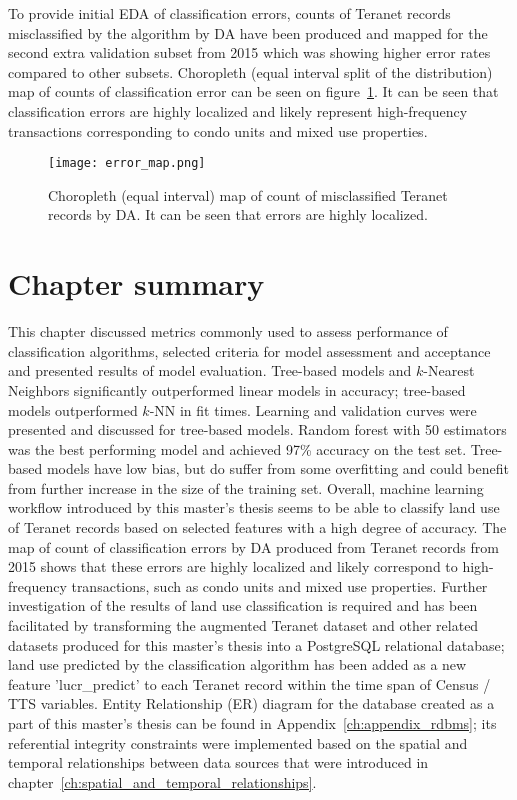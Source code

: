 To provide initial EDA of classification errors, counts of Teranet records misclassified by the algorithm by DA have been produced and mapped for the second extra validation subset from 2015 which was showing higher error rates compared to other subsets.
Choropleth (equal interval split of the distribution) map of counts of classification error can be seen on figure~\ref{fig:error_map}.
It can be seen that classification errors are highly localized and likely represent high-frequency transactions corresponding to condo units and mixed use properties.

\begin{figure}[hbt!]
    \centering
    \texttt{[image: error\_map.png]}
    \caption{Choropleth (equal interval) map of count of misclassified Teranet records by DA.
    It can be seen that errors are highly localized.}
    \label{fig:error_map}
\end{figure}

\section{Chapter summary} \label{evaluation_summary}

This chapter discussed metrics commonly used to assess performance of classification algorithms, selected criteria for model assessment and acceptance and presented results of model evaluation.
Tree-based models and $k$-Nearest Neighbors significantly outperformed linear models in accuracy;
tree-based models outperformed $k$-NN in fit times.
Learning and validation curves were presented and discussed for tree-based models.
Random forest with 50 estimators was the best performing model and achieved 97\% accuracy on the test set.
Tree-based models have low bias, but do suffer from some overfitting and could benefit from further increase in the size of the training set.
Overall, machine learning workflow introduced by this master's thesis seems to be able to classify land use of Teranet records based on selected features with a high degree of accuracy.
The map of count of classification errors by DA produced from Teranet records from 2015 shows that these errors are highly localized and likely correspond to high-frequency transactions, such as condo units and mixed use properties.
Further investigation of the results of land use classification is required and has been facilitated by transforming the augmented Teranet dataset and other related datasets produced for this master's thesis into a PostgreSQL relational database;
land use predicted by the classification algorithm has been added as a new feature 'lucr\_predict' to each Teranet record within the time span of Census / TTS variables.
Entity Relationship (ER) diagram for the database created as a part of this master's thesis can be found in Appendix~\ref{ch:appendix_rdbms};
its referential integrity constraints were implemented based on the spatial and temporal relationships between data sources that were introduced in chapter~\ref{ch:spatial_and_temporal_relationships}.